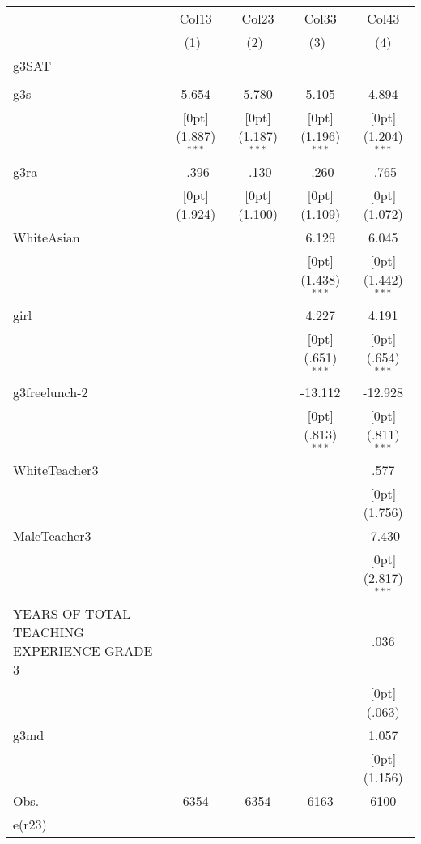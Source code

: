 \begin{tabular*}{\textwidth}{@{\extracolsep{\fill}}lcccc}				
	& \multicolumn{1}{c}{Col13} &	\multicolumn{1}{c}{Col23} &	\multicolumn{1}{c}{Col33} &	\multicolumn{1}{c}{Col43} \\
\cline{2-5}				
	& \multicolumn{1}{c}{(1)\mbox{\ }} &	\multicolumn{1}{c}{(2)\mbox{\ }} &	\multicolumn{1}{c}{(3)\mbox{\ }} &	\multicolumn{1}{c}{(4)} \\
\hline				
g3SAT &	&	&	&	\\
&	&	&	&	\\
g3s &	5.654 &	5.780 &	5.105 &	4.894 \\
&	\raisebox{.7ex}[0pt]{\scriptsize (1.887)$^{***}$} &	\raisebox{.7ex}[0pt]{\scriptsize (1.187)$^{***}$} &	\raisebox{.7ex}[0pt]{\scriptsize (1.196)$^{***}$} &	\raisebox{.7ex}[0pt]{\scriptsize (1.204)$^{***}$} \\
g3ra &	-.396 &	-.130 &	-.260 &	-.765 \\
&	\raisebox{.7ex}[0pt]{\scriptsize (1.924)} &	\raisebox{.7ex}[0pt]{\scriptsize (1.100)} &	\raisebox{.7ex}[0pt]{\scriptsize (1.109)} &	\raisebox{.7ex}[0pt]{\scriptsize (1.072)} \\
WhiteAsian &	&	&	6.129 &	6.045 \\
&	&	&	\raisebox{.7ex}[0pt]{\scriptsize (1.438)$^{***}$} &	\raisebox{.7ex}[0pt]{\scriptsize (1.442)$^{***}$} \\
girl &	&	&	4.227 &	4.191 \\
&	&	&	\raisebox{.7ex}[0pt]{\scriptsize (.651)$^{***}$} &	\raisebox{.7ex}[0pt]{\scriptsize (.654)$^{***}$} \\
g3freelunch-2 &	&	&	-13.112 &	-12.928 \\
&	&	&	\raisebox{.7ex}[0pt]{\scriptsize (.813)$^{***}$} &	\raisebox{.7ex}[0pt]{\scriptsize (.811)$^{***}$} \\
WhiteTeacher3 &	&	&	&	.577 \\
&	&	&	&	\raisebox{.7ex}[0pt]{\scriptsize (1.756)} \\
MaleTeacher3 &	&	&	&	-7.430 \\
&	&	&	&	\raisebox{.7ex}[0pt]{\scriptsize (2.817)$^{***}$} \\
YEARS OF TOTAL TEACHING EXPERIENCE GRADE 3 &	&	&	&	.036 \\
&	&	&	&	\raisebox{.7ex}[0pt]{\scriptsize (.063)} \\
g3md &	&	&	&	1.057 \\
&	&	&	&	\raisebox{.7ex}[0pt]{\scriptsize (1.156)} \\
Obs. &	6354 &	6354 &	6163 &	6100 \\
e(r23) &	&	&	&	\\
\hline\hline				
\end{tabular*}%
